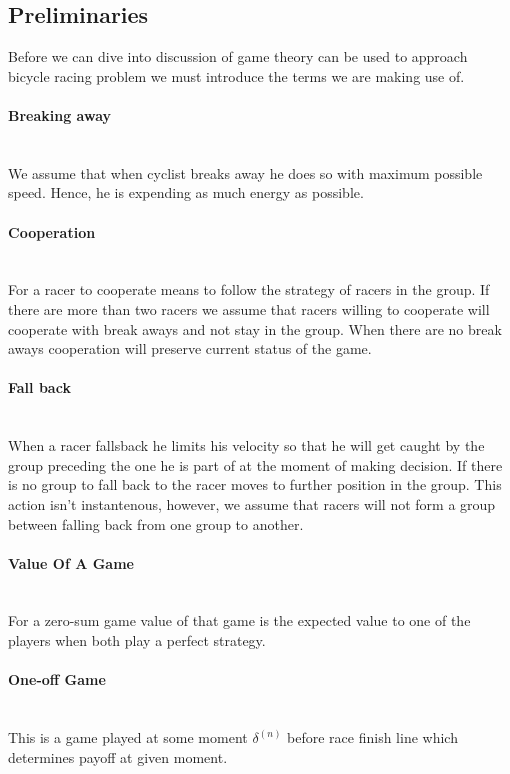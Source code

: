 \documentclass[10pt, a4paper]{report}
\begin{document}
\subsection{Preliminaries}
Before we can dive into discussion of game theory can be used to approach bicycle racing problem we must introduce the terms we are making use of.

\paragraph{Breaking away} ~\\
We assume that when cyclist breaks away he does so with maximum possible speed. Hence, he is expending as much energy as possible.

\paragraph{Cooperation} ~\\
For a racer to cooperate means to follow the strategy of racers in the group. If there are more than two racers we assume that racers willing to cooperate will cooperate with break aways and not stay in the group. When there are no break aways cooperation will preserve current status of the game.

\paragraph{Fall back} ~\\
When a racer fallsback he limits his velocity so that he will get caught by the group preceding the one he is part of at the moment of making decision. If there is no group to fall back to the racer moves to further position in the group. This action isn't instantenous, however, we assume that racers will not form a group between falling back from one group to another.

\paragraph{Value Of A Game} ~\\
For a zero-sum game value of that game is the expected value to one of the players when both play a perfect strategy.

\paragraph{One-off Game} ~\\
This is a game played at some moment $\delta^{(n)}$ before race finish line which determines payoff at given moment.
\end{document}

